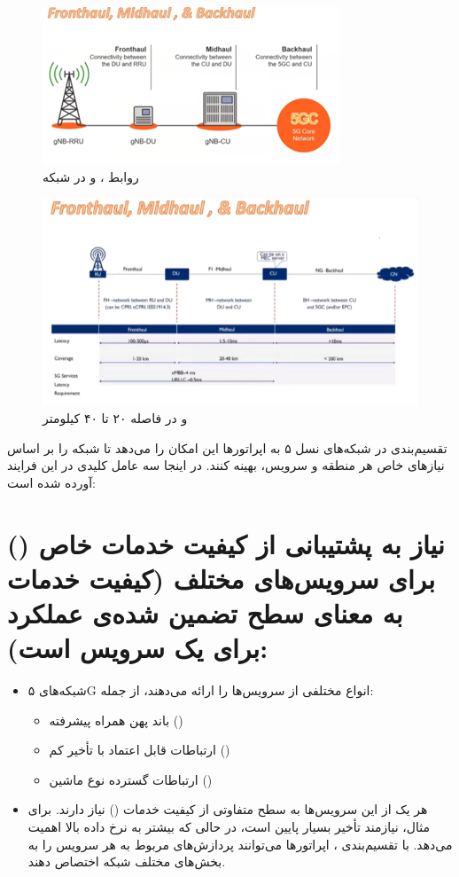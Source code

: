 \documentclass[landscape, 12pt]{report}
\begin{document}
\begin{figure}[ht]
	\centering
	\includegraphics[width=.6\linewidth]{Pic/Fronthaul_Midhaul_Backhaul}
	\caption{ روابط
		،
		و 
		در شبکه
	}
	\label{fig:Fronthaul_Midhaul_Backhaul}
\end{figure}

\begin{figure}[ht]
	\centering
	\includegraphics[width=.6\linewidth]{Pic/DUI}
	\caption{   و     در فاصله ۲۰ تا ۴۰ کیلومتر
	}
	\label{fig:Fronthaul_Midhaul_Backhaul}
\end{figure}

تقسیم‌بندی  در شبکه‌های نسل ۵ به اپراتورها این امکان را می‌دهد تا شبکه را بر اساس نیازهای خاص هر منطقه و سرویس، بهینه کنند. در اینجا سه عامل کلیدی در این فرایند آورده شده است:

\section*{ نیاز به پشتیبانی از کیفیت خدمات خاص () برای سرویس‌های مختلف (کیفیت خدمات به معنای سطح تضمین شده‌ی عملکرد برای یک سرویس است):}

\begin{itemize}
    \item شبکه‌های ۵G انواع مختلفی از سرویس‌ها را ارائه می‌دهند، از جمله:
    \begin{itemize}
        \item باند پهن همراه پیشرفته ()
        \item ارتباطات قابل اعتماد با تأخیر کم ()
        \item ارتباطات گسترده نوع ماشین ()
    \end{itemize}
    \item هر یک از این سرویس‌ها به سطح متفاوتی از کیفیت خدمات () نیاز دارند. برای مثال،  نیازمند تأخیر بسیار پایین است، در حالی که  بیشتر به نرخ داده بالا اهمیت می‌دهد. با تقسیم‌بندی ، اپراتورها می‌توانند پردازش‌های مربوط به هر سرویس را به بخش‌های مختلف شبکه اختصاص دهند.
\end{itemize}
\end{document}
